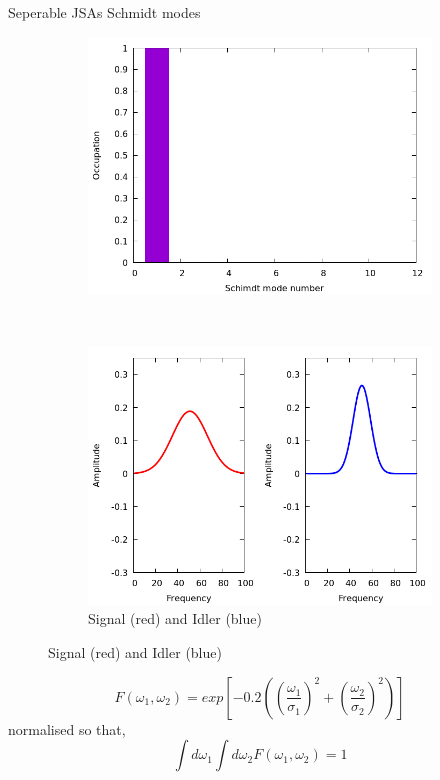 \documentclass{beamer}
\begin{document}
    \begin{frame}{Seperable JSAs Schmidt modes}
        
    \begin{figure}
        \centering
    \begin{subfigure}{0.4\textwidth}
        \includegraphics[width=1\textwidth]{sepschmidtmodesocc.png}
    \end{subfigure}
    ~
    \begin{subfigure}{0.5\textwidth}
        \includegraphics[width=1\textwidth]{sepsingle_sig_idler1.png}
        \caption{Signal (red) and Idler (blue)}
        \end{subfigure}
    \end{figure}

    \begin{equation}
        F(\omega_1,\omega_2) = exp\left[-0.2 \left( \left(\frac{\omega_1}{\sigma_1} \right)^2+\left(\frac{\omega_2}{\sigma_2} \right)^2 \right) \right]
    \end{equation}
    normalised so that,
    \begin{equation}
    \int d\omega_1 \int d\omega_2 F(\omega_1,\omega_2) = 1
    \end{equation}
\end{frame} 
\end{document}
